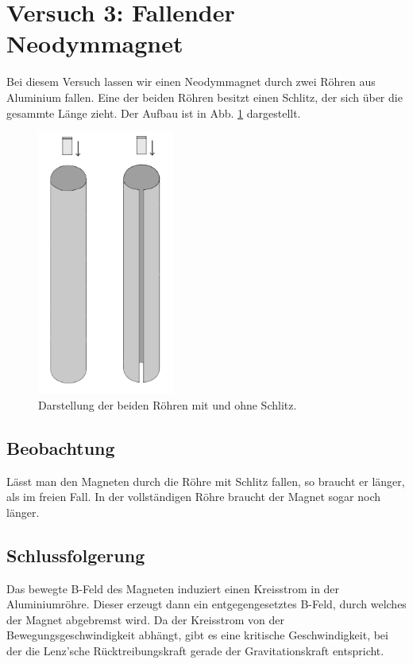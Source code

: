 \documentclass[11pt,a4paper,titlepage, ngerman]{article}
\begin{document}
	\section{Versuch 3: Fallender Neodymmagnet}		
	
		Bei diesem Versuch lassen wir einen Neodymmagnet durch zwei Röhren aus Aluminium fallen. Eine der beiden Röhren besitzt einen Schlitz, der sich über die gesammte Länge zieht. Der Aufbau ist in Abb. \ref{fig:Neodymmagnet} dargestellt.
		\begin{figure}[ht]
			\centering
			\includegraphics[width=0.4\textwidth]{Neodymmagnet.png}
			\caption{Darstellung der beiden Röhren mit und ohne Schlitz.} 
			\label{fig:Neodymmagnet}
		\end{figure}
		
		\subsection*{Beobachtung}
			
			Lässt man den Magneten durch die Röhre mit Schlitz fallen, so braucht er länger, als im freien Fall.
			In der vollständigen Röhre braucht der Magnet sogar noch länger.
			
		\subsection*{Schlussfolgerung}	
		
			Das bewegte B-Feld des Magneten induziert einen Kreisstrom in der Aluminiumröhre.
			Dieser erzeugt dann ein entgegengesetztes B-Feld, durch welches der Magnet abgebremst wird.
			Da der Kreisstrom von der Bewegungsgeschwindigkeit abhängt, gibt es eine kritische Geschwindigkeit, bei der die Lenz'sche Rücktreibungskraft gerade der Gravitationskraft entspricht.
			
\end{document}
